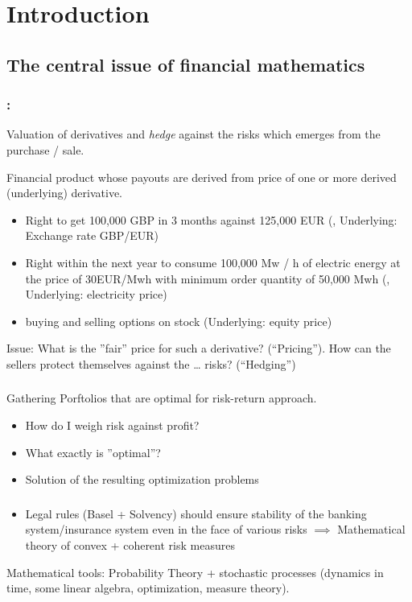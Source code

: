 \chapter{Introduction}
\section{The central issue of financial mathematics}
\subsection*{:}
Valuation of derivatives and \emph{hedge} against the risks which emerges from the purchase / sale.

\begin{*definition}
	Financial product whose payouts are derived from price of one or more  derived (underlying) derivative.
\end{*definition}
\begin{*example}
	\begin{itemize}
		\item Right to get 100,000 GBP in 3 months against 125,000 EUR (, Underlying: Exchange rate GBP/EUR)
		\item Right within the next year to consume 100,000 Mw / h of electric energy at the price of 30EUR/Mwh with minimum order quantity of 50,000 Mwh (, Underlying: electricity price)
		\item buying and selling options on stock (Underlying: equity price)
	\end{itemize}
\end{*example}
Issue:  What is the ''fair'' price for such a derivative? (``Pricing''). How can the sellers protect themselves against the … risks? (``Hedging'')
\subsection*{}
Gathering Porftolios that are optimal for risk-return approach.
\begin{itemize}
	\item How do I weigh risk against profit?
    \item What exactly is ''optimal''?
    \item Solution of the resulting optimization problems
\end{itemize}
\subsection*{}
\begin{itemize}
	\item Legal rules (Basel + Solvency) should ensure stability of the banking system/insurance system even in the face of various risks $\implies$ Mathematical theory of convex + coherent risk measures
\end{itemize}
Mathematical tools: Probability Theory + stochastic processes (dynamics in time, some linear algebra, optimization, measure theory).

